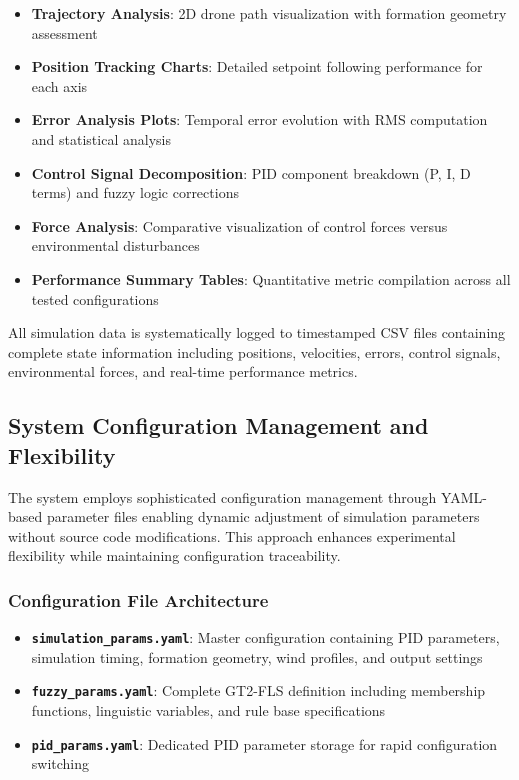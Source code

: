 \begin{itemize}
    \item \textbf{Trajectory Analysis}: 2D drone path visualization with formation geometry assessment
    \item \textbf{Position Tracking Charts}: Detailed setpoint following performance for each axis
    \item \textbf{Error Analysis Plots}: Temporal error evolution with RMS computation and statistical analysis
    \item \textbf{Control Signal Decomposition}: PID component breakdown (P, I, D terms) and fuzzy logic corrections
    \item \textbf{Force Analysis}: Comparative visualization of control forces versus environmental disturbances
    \item \textbf{Performance Summary Tables}: Quantitative metric compilation across all tested configurations
\end{itemize}

All simulation data is systematically logged to timestamped CSV files containing complete state information including positions, velocities, errors, control signals, environmental forces, and real-time performance metrics.

\subsection*{System Configuration Management and Flexibility}

The system employs sophisticated configuration management through YAML-based parameter files enabling dynamic adjustment of simulation parameters without source code modifications. This approach enhances experimental flexibility while maintaining configuration traceability.

\subsubsection*{Configuration File Architecture}

\begin{itemize}
    \item \textbf{\texttt{simulation\_params.yaml}}: Master configuration containing PID parameters, simulation timing, formation geometry, wind profiles, and output settings
    \item \textbf{\texttt{fuzzy\_params.yaml}}: Complete GT2-FLS definition including membership functions, linguistic variables, and rule base specifications
    \item \textbf{\texttt{pid\_params.yaml}}: Dedicated PID parameter storage for rapid configuration switching
\end{itemize}


